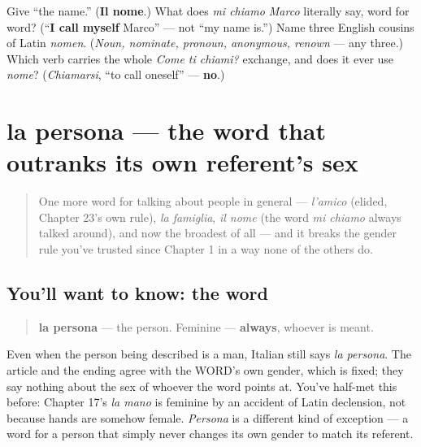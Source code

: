\begin{tcolorbox}[breakable,colback=teal!4,colframe=teal!35!black,title={Before you move on}]
Give \textquotedblleft{}the name.\textquotedblright{} (\textbf{Il nome}.) What does \emph{mi chiamo Marco} literally say, word for word? (\textquotedblleft{}\textbf{I call myself} Marco\textquotedblright{} — not \textquotedblleft{}my name is.\textquotedblright{}) Name three English cousins of Latin \emph{nomen}. (\emph{Noun, nominate, pronoun, anonymous, renown} — any three.) Which verb carries the whole \emph{Come ti chiami?} exchange, and does it ever use \emph{nome}? (\emph{Chiamarsi}, \textquotedblleft{}to call oneself\textquotedblright{} — \textbf{no}.)
\end{tcolorbox}
\section[la persona]{la persona — the word that outranks its own referent's sex}

\label{lesson:IT-C23-persona}



\begin{quote}
One more word for talking about people in general — \emph{l'amico} (elided, Chapter 23's own rule), \emph{la famiglia}, \emph{il nome} (the word \emph{mi chiamo} always talked around), and now the broadest of all — and it breaks the gender rule you've trusted since Chapter 1 in a way none of the others do.
\end{quote}

\subsection*{You'll want to know: the word}
\begin{quote}
\textbf{la persona} — the person. Feminine — \textbf{always}, whoever is meant.
\end{quote}

Even when the person being described is a man, Italian still says \emph{la persona}. The article and the ending agree with the WORD's own gender, which is fixed; they say nothing about the sex of whoever the word points at. You've half-met this before: Chapter 17's \emph{la mano} is feminine by an accident of Latin declension, not because hands are somehow female. \emph{Persona} is a different kind of exception — a word for a person that simply never changes its own gender to match its referent.

